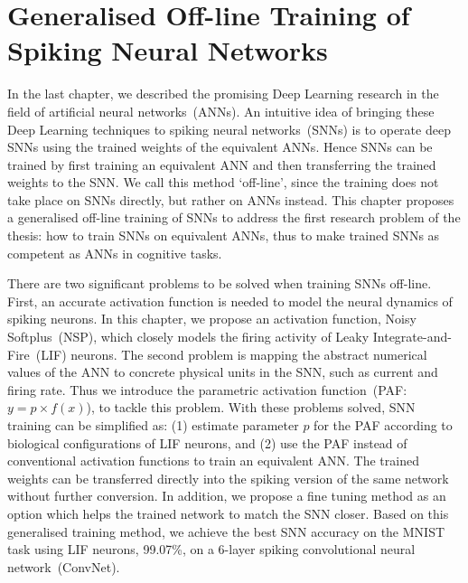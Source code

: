 \chapter{Generalised Off-line Training of Spiking Neural Networks}
\label{cha:Conv}

In the last chapter, we described the promising Deep Learning research in the field of artificial neural networks~(ANNs). 
An intuitive idea of bringing these Deep Learning techniques to spiking neural networks~(SNNs) is to operate deep SNNs using the trained weights of the equivalent ANNs.
Hence SNNs can be trained by first training an equivalent ANN and then transferring the trained weights to the SNN.
We call this method `off-line', since the training does not take place on SNNs directly, but rather on ANNs instead.
This chapter proposes a generalised off-line training of SNNs to address the first research problem of the thesis: how to train SNNs on equivalent ANNs, thus to make trained SNNs as competent as ANNs in cognitive tasks. 


There are two significant problems to be solved when training SNNs off-line.
First, an accurate activation function is needed to model the neural dynamics of spiking neurons.
In this chapter, we propose an activation function, 
Noisy Softplus~(NSP), which closely models the firing activity of Leaky Integrate-and-Fire~(LIF) neurons.
The second problem is mapping the abstract numerical values of the ANN to concrete physical units in the SNN, such as current and firing rate.
Thus we introduce the parametric activation function~(PAF: $y = p \times f(x)$), to tackle this problem.
With these problems solved, SNN training can be simplified as: (1) estimate parameter $p$ for the PAF according to biological configurations of LIF neurons, and (2) use the PAF instead of conventional activation functions to train an equivalent ANN.
The trained weights can be transferred directly into the spiking version of the same network without further conversion.
In addition, we propose a fine tuning method as an option which helps the trained network to match the SNN closer.
Based on this generalised training method, we achieve the best SNN accuracy on the MNIST task using LIF neurons, 99.07\%, on a 6-layer spiking convolutional neural network~(ConvNet).

